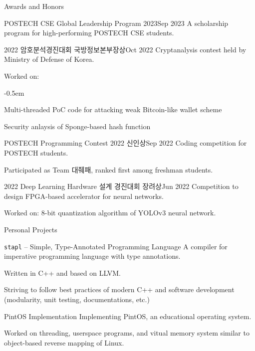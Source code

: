 \documentclass{resume}
\begin{document}
\begin{res-section}{Awards and Honors}
  \begin{res-subsection}{POSTECH CSE Global Leadership Program 2023}{Sep 2023}
    A scholarship program for high-performing POSTECH CSE students.
  \end{res-subsection}

  \begin{res-subsection}{2022 암호분석경진대회 국방정보본부장상}{Oct 2022}
    Cryptanalysis contest held by Ministry of Defense of Korea.

    \item Worked on:
    \vspace{-0.5em}
    \begin{list}{--}{}
      \itemsep -0.5em
      \item Multi-threaded PoC code for attacking weak Bitcoin-like wallet scheme
      \item Security anlaysis of Sponge-based hash function
    \end{list}
  \end{res-subsection}

  \begin{res-subsection}{POSTECH Programming Contest 2022 신인상}{Sep 2022}
    Coding competition for POSTECH students.

    \item Participated as Team 대줴패, ranked first among freshman students.
  \end{res-subsection}

  \begin{res-subsection}{2022 Deep Learning Hardware 설계 경진대회 장려상}{Jun 2022}
    Competition to design FPGA-based accelerator for neural networks.

    \item Worked on: 8-bit quantization algorithm of YOLOv3 neural network.
  \end{res-subsection}
\end{res-section}

\begin{res-section}{Personal Projects}
  \begin{res-subsection}{\texttt{stapl} -- Simple, Type-Annotated Programming Language}{}
    A compiler for imperative programming language with type annotations.

    \item Written in C++ and based on LLVM.

    \item Striving to follow best practices of modern C++ and software development (modularity, unit testing, documentations, etc.)
  \end{res-subsection}

  \begin{res-subsection}{PintOS Implementation}{}
    Implementing PintOS, an educational operating system.

    \item Worked on threading, userspace programs, and vitual memory system similar to object-based reverse mapping of Linux.
  \end{res-subsection}
\end{res-section}
\end{document}
